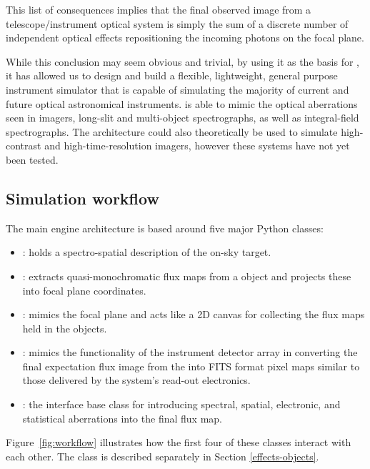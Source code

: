 This list of consequences implies that the final observed image from a telescope/instrument optical system is simply the sum of a discrete number of independent optical effects repositioning the incoming photons on the focal plane.

While this conclusion may seem obvious and trivial, by using it as the basis for \ScopeSim{}, it has allowed us to design and build a flexible, lightweight, general purpose instrument simulator that is capable of simulating the majority of current and future optical astronomical instruments.
\ScopeSim{} is able to mimic the optical aberrations seen in imagers, long-slit and multi-object spectrographs, as well as integral-field spectrographs.
The architecture could also theoretically be used to simulate high-contrast and high-time-resolution imagers, however these systems have not yet been tested.


\subsection{Simulation workflow}
\label{simulation-workflow}

The main \ScopeSim{} engine architecture is based around five major Python classes:

\begin{itemize}
\item \textbf{\Source{}}: holds a spectro-spatial description of the on-sky target.

\item \textbf{\FieldOfView{}}: extracts quasi-monochromatic flux maps from a \Source{} object and projects these into focal plane coordinates.

\item \textbf{\ImagePlane{}}: mimics the focal plane and acts like a 2D canvas for collecting the flux maps held in the \FieldOfView{} objects.

\item \textbf{\DetectorArray}: mimics the functionality of the instrument detector array in converting the final expectation flux image from the \ImagePlane{} into FITS format pixel maps similar to those delivered by the system's read-out electronics.

\item \textbf{\Effect{}}: the interface base class for introducing spectral, spatial, electronic, and statistical aberrations into the final flux map.
\end{itemize}

Figure~\ref{fig:workflow} illustrates how the first four of these classes interact with each other.
The \Effect{} class is described separately in Section \ref{effects-objects}.

